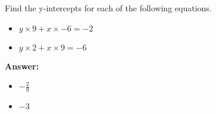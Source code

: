  Find the y-intercepts for each of the following equations. \begin{itemize}\item \( y \times 9 + x \times -6 = -2 \)\item \( y \times 2 + x \times 9 = -6 \)\end{itemize}

        \textbf{Answer:} \begin{itemize}\item \( -\frac{2}{9} \)\item \( -3 \)\end{itemize}
